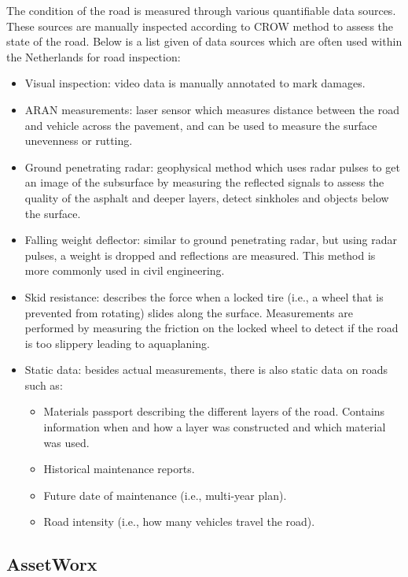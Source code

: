The condition of the road is measured through various quantifiable data sources. These sources are manually inspected according to CROW method to assess the state of the road. Below is a list given of data sources which are often used within the Netherlands for road inspection:
\begin{itemize}
\item Visual inspection: video data is manually annotated to mark damages.
\item ARAN measurements: laser sensor which measures distance between the road and vehicle across the pavement, and can be used to measure the surface unevenness or rutting.
\item Ground penetrating radar: geophysical method which uses radar pulses to get an image of the subsurface by measuring the reflected signals to assess the quality of the asphalt and deeper layers, detect sinkholes and objects below the surface.
\item Falling weight deflector: similar to ground penetrating radar, but using radar pulses, a weight is dropped and reflections are measured. This method is more commonly used in civil engineering. 
\item Skid resistance: describes the force when a locked tire (i.e., a wheel that is prevented from rotating) slides along the surface. Measurements are performed by measuring the friction on the locked wheel to detect if the road is too slippery leading to aquaplaning.
\item Static data:  besides actual measurements, there is also static data on roads such as:
\begin{itemize}
\item Materials passport describing the different layers of the road. Contains information when and how a layer was constructed and which material was used.
\item Historical maintenance reports.
\item Future date of maintenance (i.e., multi-year plan). 
\item Road intensity (i.e., how many vehicles travel the road).
\end{itemize}
\end{itemize}

\subsection{AssetWorx}
\label{sec:assetworx}

